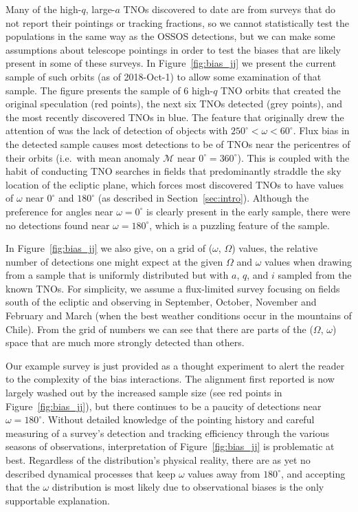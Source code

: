 \documentclass[preprint]{aastex62}
\begin{document}
Many of the high-$q$, large-$a$ TNOs discovered to date are from surveys that do not report their pointings or tracking fractions, so we cannot statistically test the populations in the same way as the OSSOS detections, but we can make some assumptions about telescope pointings in order to test the biases that are likely present in some of these surveys.
In Figure~\ref{fig:bias_jj} we present the current sample of such
orbits (as of 2018-Oct-1) to allow some examination of that sample.
The figure presents the sample of 6 high-$q$ TNO orbits that created the original
speculation (red points), the next six TNOs detected (grey
points), and the most recently discovered TNOs in blue.  The feature
that originally drew the attention of \citet{trujillosheppard14} was the lack of detection of
objects with $250^{\circ}< \omega < 60^{\circ}$.  Flux bias in the detected sample
causes most detections to be of TNOs near the pericentres of their
orbits (i.e.\ with mean anomaly $\mathcal{M}$ near $0^{\circ}=360^{\circ}$).  This is coupled with the
habit of conducting TNO searches in fields that predominantly
straddle the sky location of the ecliptic plane, which forces most
discovered TNOs to have values of $\omega$ near $0^{\circ}$ and $180^{\circ}$ (as described in Section~\ref{sec:intro}).
Although the preference for angles near $\omega=0^{\circ}$ is clearly present in the
early sample, there were no detections found near $\omega=180^{\circ}$, which is a puzzling feature of the sample.

In Figure~\ref{fig:bias_jj} we also give, on a grid of ($\omega$, $\Omega$) values, the relative
number of detections one might expect at the given $\Omega$ and
$\omega$ values when drawing from a sample that is uniformly
distributed but with $a$, $q$, and $i$ sampled from the known TNOs.
For simplicity, we assume a flux-limited survey focusing on fields south of the
ecliptic and observing in September, October, November and February
and March (when the best weather conditions occur in the mountains of Chile).  
From the grid of numbers we can see that there are parts
of the ($\Omega$, $\omega$) space that are much more strongly detected than others.  

Our
example survey is just provided as a thought experiment to alert the reader to the complexity of the bias interactions. 
The alignment first reported is now largely washed out by the increased sample size (see red points in Figure~\ref{fig:bias_jj}), but there continues to be a paucity of detections near $\omega = 180^{\circ}$.
Without detailed knowledge of the pointing history and careful measuring of a survey's detection and tracking efficiency through the various seasons of observations,
interpretation of Figure~\ref{fig:bias_jj} is problematic at best.  Regardless of the
distribution's physical reality, there are as yet no described dynamical
processes that keep $\omega$ values away from $180^{\circ}$, and
accepting that the $\omega$ distribution is most likely due to observational biases is
the only supportable explanation.
\end{document}
